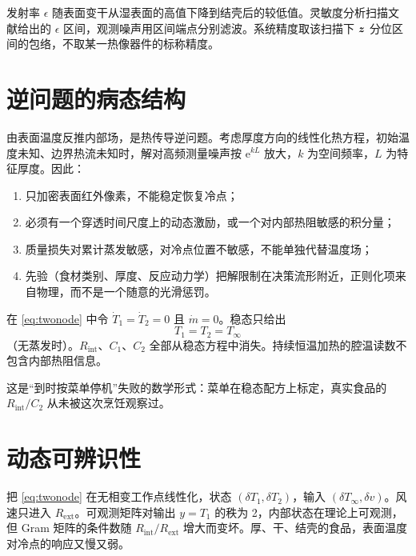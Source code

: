 发射率 $\epsilon$ 随表面变干从湿表面的高值下降到结壳后的较低值。灵敏度分析扫描文献给出的 $\epsilon$ 区间，观测噪声用区间端点分别滤波。系统精度取该扫描下 $\bm{z}$ 分位区间的包络，不取某一热像器件的标称精度。

\section{逆问题的病态结构}

由表面温度反推内部场，是热传导逆问题。考虑厚度方向的线性化热方程，初始温度未知、边界热流未知时，解对高频测量噪声按 $\mathrm{e}^{kL}$ 放大，$k$ 为空间频率，$L$ 为特征厚度。因此：

\begin{enumerate}
\item 只加密表面红外像素，不能稳定恢复冷点；
\item 必须有一个穿透时间尺度上的动态激励，或一个对内部热阻敏感的积分量；
\item 质量损失对累计蒸发敏感，对冷点位置不敏感，不能单独代替温度场；
\item 先验（食材类别、厚度、反应动力学）把解限制在决策流形附近，正则化项来自物理，而不是一个随意的光滑惩罚。
\end{enumerate}

\begin{proposition}[静态观测不足以分离内外热阻]
在 \eqref{eq:twonode} 中令 $\dot T_1=\dot T_2=0$ 且 $\dot m=0$。稳态只给出
\begin{equation}
T_1=T_2=T_\infty
\end{equation}
（无蒸发时）。$R_{\mathrm{int}}$、$C_1$、$C_2$ 全部从稳态方程中消失。持续恒温加热的腔温读数不包含内部热阻信息。
\end{proposition}

这是“到时按菜单停机”失败的数学形式：菜单在稳态配方上标定，真实食品的 $R_{\mathrm{int}}/C_2$ 从未被这次烹饪观察过。

\section{动态可辨识性}

把 \eqref{eq:twonode} 在无相变工作点线性化，状态 $(\delta T_1,\delta T_2)$，输入 $(\delta T_\infty,\delta v)$。风速只进入 $R_{\mathrm{ext}}$。可观测矩阵对输出 $y=T_1$ 的秩为 2，内部状态在理论上可观测，但 Gram 矩阵的条件数随 $R_{\mathrm{int}}/R_{\mathrm{ext}}$ 增大而变坏。厚、干、结壳的食品，表面温度对冷点的响应又慢又弱。


